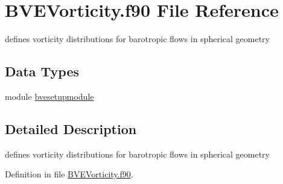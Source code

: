 \hypertarget{_b_v_e_vorticity_8f90}{\section{B\+V\+E\+Vorticity.\+f90 File Reference}
\label{_b_v_e_vorticity_8f90}
}


defines vorticity distributions for barotropic flows in spherical geometry  


\subsection*{Data Types}
\begin{DoxyCompactItemize}
\item 
module \hyperlink{classbvesetupmodule}{bvesetupmodule}
\end{DoxyCompactItemize}


\subsection{Detailed Description}
defines vorticity distributions for barotropic flows in spherical geometry 



Definition in file \hyperlink{_b_v_e_vorticity_8f90_source}{B\+V\+E\+Vorticity.\+f90}.

